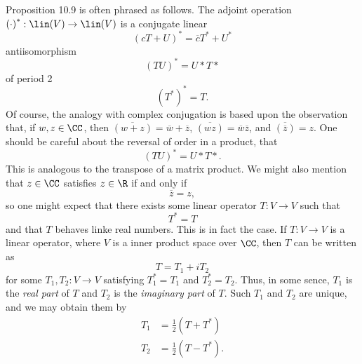 \documentclass[linearalgebra]{subfiles}
\begin{document}
    \begin{remark}
        Proposition 10.9 is often phrased as follows. The adjoint operation $\left( \cdot \right) ^*:\lin(V)\to\lin(V)$ is a conjugate linear
        \begin{equation*}
            \left( cT+U \right) ^* = \overline{c} T^* + U^*
        \end{equation*}
        antiisomorphism
        \begin{equation*}
            \left( TU \right) ^* = U*T*
        \end{equation*}
        of period 2
        \begin{equation*}
            \left( T^* \right) ^* = T.
        \end{equation*}
        Of course, the analogy with complex conjugation is based upon the observation that, if $w,z\in\CC$, then $\overline{\left( w+z \right) } = \overline{w} + \overline{z}$, $\overline{\left( wz \right) } =  \overline{w} \overline{z}$, and $\overline{\left( \overline{z}  \right) } = z$. One should be careful about the reversal of order in a product, that
        \begin{equation*}
            \left( TU \right) ^* = U*T*.
        \end{equation*}
        This is analogous to the transpose of a matrix product. We might also mention that $z\in\CC$ satisfies $z\in\R$ if and only if
        \begin{equation*}
            \overline{z} = z,
        \end{equation*}
        so one might expect that there exists some linear operator $T:V\to V$ such that
        \begin{equation*}
            T^* = T
        \end{equation*}
        and that $T$ behaves linke real numbers. This is in fact the case. If $T:V\to V$ is a linear operator, where $V$ is a inner product space over $\CC$, then $T$ can be written as
        \begin{equation*}
            T = T_1 + iT_2
        \end{equation*}
        for some $T_1, T_2:V\to V$ satisfying $T_1^* = T_1$ and $T_2^* = T_2$. Thus, in some sence, $T_1$ is the \textit{real part} of $T$ and $T_2$ is the \textit{imaginary part} of $T$. Such $T_1$ and $T_2$ are unique, and we may obtain them by
        \begin{align*}
            T_1 & = \frac{1}{2}\left( T+T^* \right) \\
            T_2 & = \frac{1}{2}\left( T-T^* \right) .
        \end{align*} 
    \end{remark}
\end{document}
